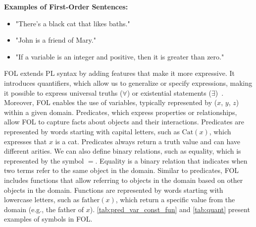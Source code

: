 \textbf{Examples of First-Order Sentences:}
\begin{itemize}[itemsep=2pt]
    \renewcommand{\labelitemi}{}  
    \item "There's a black cat that likes baths." 
    \item "John is a friend of Mary." 
    \item "If a variable is an integer and positive, then it is greater than zero." 
\end{itemize}  

\gls{FOL} extends \gls{PL} syntax by adding features that make it more expressive. It introduces quantifiers, which allow us to generalize or specify expressions, making it possible to express universal truths (\(\forall\)) or existential statements (\(\exists\))~\cite{huth_2004_logic}. Moreover, FOL enables the use of variables, typically represented by (\(x\), \(y\), \(z\)) within a given domain. Predicates, which express properties or relationships, allow \gls{FOL} to capture facts about objects and their interactions. Predicates are represented by words starting with capital letters, such as \( \text{Cat}(x) \), which expresses that \( x \) is a cat. Predicates always return a truth value and can have different arities. We can also define binary relations, such as equality, which is represented by the symbol \( = \). Equality is a binary relation that indicates when two terms refer to the same object in the domain. Similar to predicates, \gls{FOL} includes functions that allow referring to objects in the domain based on other objects in the domain. Functions are represented by words starting with lowercase letters, such as \( \text{father}(x) \), which return a specific value from the domain (e.g., the father of \( x \)). \autoref{tab:pred_var_const_fun} and \autoref{tab:quant} present examples of symbols in \gls{FOL}.


\begin{table}[h!]
    \centering
    \caption{Variables, constants, predicates, and functions in First-Order Logic}
    \label{tab:pred_var_const_fun}
\end{table}

